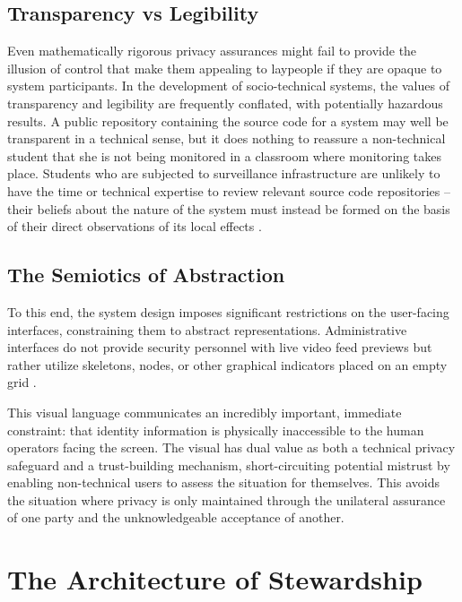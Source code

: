 \documentclass[conference]{IEEEtran}
\begin{document}
\subsection{Transparency vs Legibility}
Even mathematically rigorous privacy assurances might fail to provide the illusion of control that make them appealing to laypeople if they are opaque to system participants. In the development of socio-technical systems, the values of transparency and legibility are frequently conflated, with potentially hazardous results. A public repository containing the source code for a system may well be transparent in a technical sense, but it does nothing to reassure a non-technical student that she is not being monitored in a classroom where monitoring takes place. Students who are subjected to surveillance infrastructure are unlikely to have the time or technical expertise to review relevant source code repositories – their beliefs about the nature of the system must instead be formed on the basis of their direct observations of its local effects \cite{b14}.

\subsection{The Semiotics of Abstraction}

To this end, the system design imposes significant restrictions on the user-facing interfaces, constraining them to abstract representations. Administrative interfaces do not provide security personnel with live video feed previews but rather utilize skeletons, nodes, or other graphical indicators placed on an empty grid \cite{b19}.

This visual language communicates an incredibly important, immediate constraint: that identity information is physically inaccessible to the human operators facing the screen. The visual has dual value as both a technical privacy safeguard and a trust-building mechanism, short-circuiting potential mistrust by enabling non-technical users to assess the situation for themselves. This avoids the situation where privacy is only maintained through the unilateral assurance of one party and the unknowledgeable acceptance of another.

\section{The Architecture of Stewardship}
\end{document}
